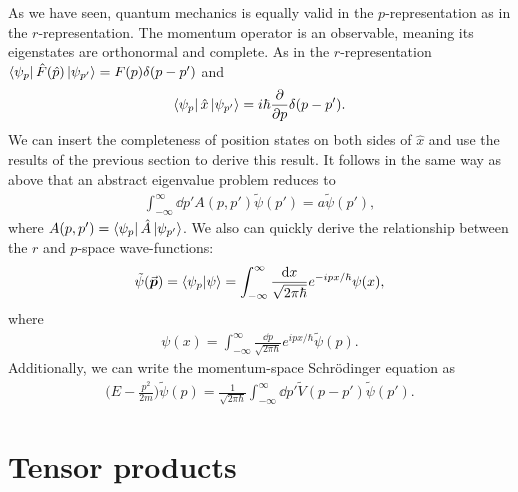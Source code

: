 As we have seen, quantum mechanics is equally valid in the $p$-representation as in the $r$-representation.
The momentum operator is an observable, meaning its eigenstates are orthonormal and complete.
As in the $r$-representation $\bra{\psi_{p}} \hat{F}(\hat{p}) \ket{\psi_{p'}} = F(p) \delta(p-p')$ and
\begin{eqnarray}
    \bra{\psi_{p}} \hat{x} \ket{\psi_{p'}} = i\hbar \pdv{p} \delta(p-p')
.\end{eqnarray}
We can insert the completeness of position states on both sides of $\hat{x}$ and use the results of the previous section to derive this result.
It follows in the same way as above that an abstract eigenvalue problem reduces to
\begin{eqnarray}
    \int_{-\infty}^{\infty} \dd{p'} A(p,p') \tilde{\psi}(p') = a \tilde{\psi}(p')
,\end{eqnarray}
where $A(p,p') = \bra{\psi_{p}}\hat{A}\ket{\psi_{p'}}$.
We also can quickly derive the relationship between the $r$ and $p$-space wave-functions:
\begin{eqnarray}
    \tilde{\psi}(\va*{p}) = \bra{\psi_{p}}\ket{\psi} = \int_{-\infty}^{\infty} \frac{\dd{x}}{\sqrt{2 \pi \hbar}} e^{-ipx/\hbar} \psi(x)
,\end{eqnarray}
where
\begin{eqnarray}
    \psi(x) = \int_{-\infty}^{\infty} \frac{\dd{p}}{\sqrt{2\pi \hbar}} e^{ipx/\hbar} \tilde{\psi}(p)
.\end{eqnarray}
Additionally, we can write the momentum-space Schr\"{o}dinger equation as
\begin{eqnarray}
    \Big( E - \frac{p^2}{2m} \Big) \tilde{\psi}(p) = \frac{1}{\sqrt{2 \pi \hbar}} \int_{-\infty}^{\infty} \dd{p'} \tilde{V}(p - p') \tilde{\psi}(p')
.\end{eqnarray}


\section{Tensor products}

